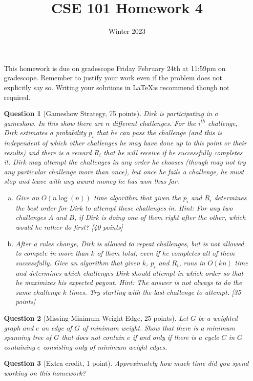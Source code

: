 \documentclass{article}
\title{CSE 101 Homework 4}
\date{Winter 2023}
\newtheorem{ques}{Question}
\begin{document}
\maketitle

This homework is due on gradescope Friday February 24th at 11:59pm on gradescope. Remember to justify your work even if the problem does not explicitly say so. Writing your solutions in \LaTeX is recommend though not required.

\begin{ques}[Gameshow Strategy, 75 points]
Dirk is participating in a gameshow. In this show there are $n$ different challenges. For the $i^{th}$ challenge, Dirk estimates a probability $p_i$ that he can pass the challenge (and this is independent of which other challenges he may have done up to this point or their results) and there is a reward $R_i$ that he will receive if he successfully completes it. Dirk may attempt the challenges in any order he chooses (though may not try any particular challenge more than once), but once he fails a challenge, he must stop and leave with any award money he has won thus far.
\begin{enumerate}[(a)]
\item
Give an $O(n\log(n))$ time algorithm that given the $p_i$ and $R_i$ determines the best order for Dirk to attempt these challenges in. Hint: For any two challenges $A$ and $B$, if Dirk is doing one of them right after the other, which would he rather do first? [40 points]
\item
After a rules change, Dirk is allowed to repeat challenges, but is not allowed to compete in more than $k$ of them total, even if he completes all of them successfully. Give an algorithm that given $k$, $p_i$ and $R_i$, runs in $O(kn)$ time and determines which challenges Dirk should attempt in which order so that he maximizes his expected payout. Hint: The answer is not always to do the same challenge $k$ times. Try starting with the last challenge to attempt. [35 points]
\end{enumerate}
\end{ques}

\begin{ques}[Missing Minimum Weight Edge, 25 points]
Let $G$ be a weighted graph and $e$ an edge of $G$ of minimum weight. Show that there is a minimum spanning tree of $G$ that does not contain $e$ if and only if there is a cycle $C$ in $G$ containing $e$ consisting only of minimum weight edges.
\end{ques}

\begin{ques}[Extra credit, 1 point]
Approximately how much time did you spend working on this homework?
\end{ques}
\end{document}
